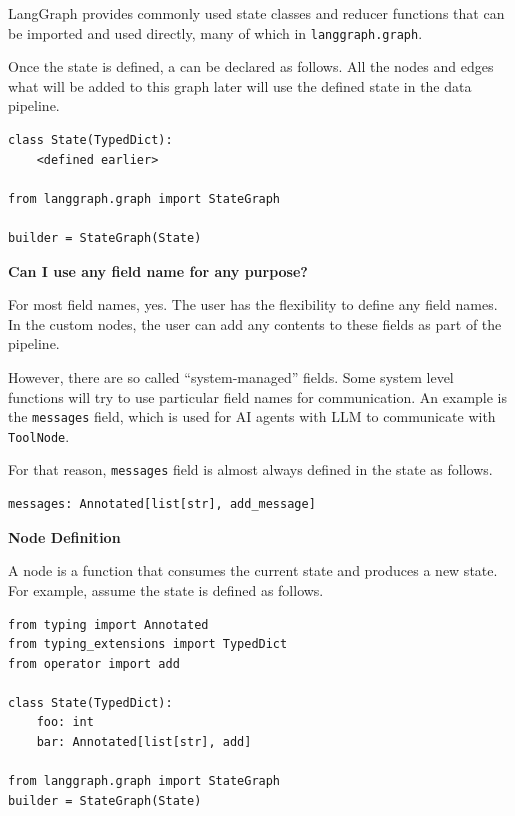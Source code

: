 LangGraph provides commonly used state classes and reducer functions that can be imported and used directly, many of which in \texttt{langgraph.graph}.

Once the state is defined, a  can be declared as follows. All the nodes and edges what will be added to this graph later will use the defined state in the data pipeline.
\begin{lstlisting}
class State(TypedDict):
    <defined earlier>

from langgraph.graph import StateGraph

builder = StateGraph(State)
\end{lstlisting}

\begin{mdframed}
\noindent \textbf{Can I use any field name for any purpose?}

For most field names, yes. The user has the flexibility to define any field names. In the custom nodes, the user can add any contents to these fields as part of the pipeline.

However, there are so called ``system-managed'' fields. Some system level functions will try to use particular field names for communication. An example is the \verb|messages| field, which is used for AI agents with LLM to communicate with \verb|ToolNode|.

For that reason, \verb|messages| field is almost always defined in the state as follows.

\begin{lstlisting}
messages: Annotated[list[str], add_message]
\end{lstlisting}

\end{mdframed}

\vspace{0.1in}
\noindent \textbf{Node Definition}
\vspace{0.1in}

A node is a function that consumes the current state and produces a new state. For example, assume the state is defined as follows.
\begin{lstlisting}
from typing import Annotated
from typing_extensions import TypedDict
from operator import add

class State(TypedDict):
    foo: int
    bar: Annotated[list[str], add]

from langgraph.graph import StateGraph
builder = StateGraph(State)
\end{lstlisting}

